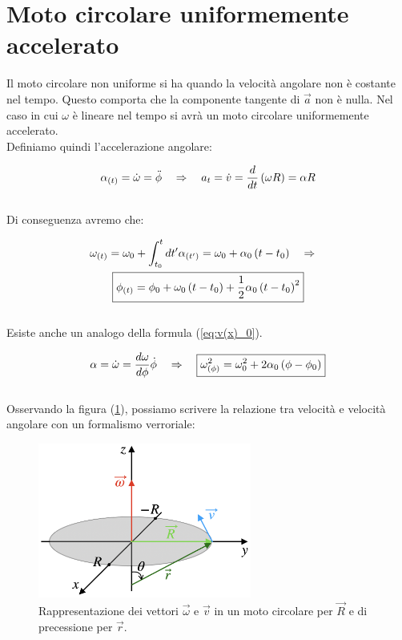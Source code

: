 \section{Moto circolare uniformemente accelerato}
Il moto circolare non uniforme si ha quando la velocità angolare non è
costante nel tempo. Questo comporta che la componente tangente di $\vec a$ non è nulla. Nel caso in cui $\omega$ è lineare nel tempo si avrà un moto circolare uniformemente accelerato.
\\ Definiamo quindi l'accelerazione angolare:

\begin{equation}
    \alpha_{(t)} = \dot \omega = \ddot \phi\quad\Rightarrow\quad a_t = \dot v =
    \frac d{dt}\left( \omega R\right) = \alpha R
\end{equation}
\\
Di conseguenza avremo che:

\begin{multline}
    \omega_{(t)} = \omega_0 + \int_{t_0}^tdt'\alpha_{(t')}  = \omega_0 + \alpha_0\left( t - t_0\right) \quad\Rightarrow\quad
    \\\boxed{\phi_{(t)} = \phi_0 + \omega_0\left( t - t_0\right)+ \frac12\alpha_0\left( t - t_0\right)^2}
\end{multline}
\\
Esiste anche un analogo della formula (\ref{eq:v(x)_0}).

\begin{equation}
    \alpha =\dot \omega = \frac{d\omega}{d\phi}\dot\phi\quad\Rightarrow\quad
    \boxed{\omega^2_{(\phi)} = \omega_0^2 + 2\alpha_0\left(\phi-\phi_0\right)}
\label{eq:w(phi)}
\end{equation}
\\
Osservando la figura (\ref{fig:rotantvector}), possiamo scrivere la relazione
tra velocità e velocità angolare con un formalismo verroriale:

\begin{figure}[htbp]
    \centering
        \includegraphics[width=7cm]{images/ovetr.png}
        \caption{Rappresentazione dei vettori $\vec\omega$ e $\vec v$ in un moto
        circolare per $\vec R$ e di precessione per $\vec r$.}
\label{fig:rotantvector}
\end{figure}

